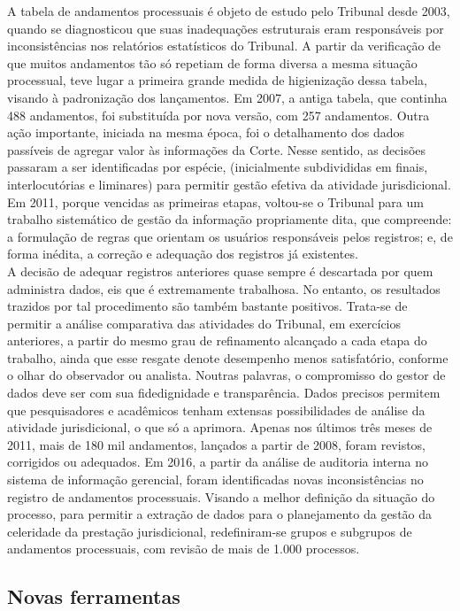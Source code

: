 \documentclass[
]{book}
\begin{document}
A tabela de andamentos processuais é objeto de estudo pelo Tribunal desde 2003, quando se diagnosticou que suas inadequações estruturais eram responsáveis por inconsistências nos relatórios estatísticos do Tribunal.
A partir da verificação de que muitos andamentos tão só repetiam de forma diversa a mesma situação processual, teve lugar a primeira grande medida de higienização dessa tabela, visando à padronização dos lançamentos. Em 2007, a antiga tabela, que continha 488 andamentos, foi substituída por nova versão, com 257 andamentos.
Outra ação importante, iniciada na mesma época, foi o detalhamento dos dados passíveis de agregar valor às informações da Corte. Nesse sentido, as decisões passaram a ser identificadas por espécie, (inicialmente subdivididas em finais, interlocutórias e liminares) para permitir gestão efetiva da atividade jurisdicional.
Em 2011, porque vencidas as primeiras etapas, voltou-se o Tribunal para um trabalho sistemático de gestão da informação propriamente dita, que compreende: a formulação de regras que orientam os usuários responsáveis pelos registros; e, de forma inédita, a correção e adequação dos registros já existentes.\\
A decisão de adequar registros anteriores quase sempre é descartada por quem administra dados, eis que é extremamente trabalhosa. No entanto, os resultados trazidos por tal procedimento são também bastante positivos. Trata-se de permitir a análise comparativa das atividades do Tribunal, em exercícios anteriores, a partir do mesmo grau de refinamento alcançado a cada etapa do trabalho, ainda que esse resgate denote desempenho menos satisfatório, conforme o olhar do observador ou analista. Noutras palavras, o compromisso do gestor de dados deve ser com sua fidedignidade e transparência.
Dados precisos permitem que pesquisadores e acadêmicos tenham extensas possibilidades de análise da atividade jurisdicional, o que só a aprimora.
Apenas nos últimos três meses de 2011, mais de 180 mil andamentos, lançados a partir de 2008, foram revistos, corrigidos ou adequados.
Em 2016, a partir da análise de auditoria interna no sistema de informação gerencial, foram identificadas novas inconsistências no registro de andamentos processuais. Visando a melhor definição da situação do processo, para permitir a extração de dados para o planejamento da gestão da celeridade da prestação jurisdicional, redefiniram-se grupos e subgrupos de andamentos processuais, com revisão de mais de 1.000 processos.

\hypertarget{novas-ferramentas}{%
\subsection{Novas ferramentas}\label{novas-ferramentas}}
\end{document}
